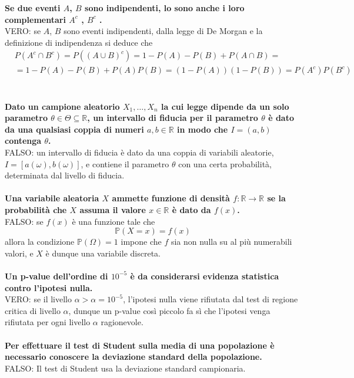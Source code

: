 \noindent \textbf{Se due eventi $A$, $B$ sono indipendenti, lo sono anche i loro complementari $A^c$ , $B^c$ .}\\
VERO: se $A$, $B$ sono eventi indipendenti, dalla legge di De Morgan e la definizione di indipendenza si deduce che
\begin{align*}
	&P(A^c \cap B^c) = P((A \cup B)^c) = 1-P(A)-P(B)+P(A \cap B) =\\
	& = 1 - P(A) - P(B) + P(A)P(B) = (1-P(A))(1-P(B)) = P(A^c)P(B^c)
\end{align*}\\\\

\noindent\textbf{Dato un campione aleatorio $X_1, \ldots, X_n$ la cui legge dipende da un solo parametro $\theta \in \Theta \subseteq \mathbb{R}$, un intervallo di fiducia per il parametro $\theta$ è dato da una qualsiasi coppia di numeri $a, b \in \mathbb{R}$ in modo che $I = (a, b)$ contenga $\theta$.}\\
FALSO: un intervallo di fiducia è dato da una coppia di variabili aleatorie, $I = [a(\omega), b(\omega)]$, e contiene il parametro $\theta$ con una certa probabilità, determinata dal livello di fiducia.\\\\

\noindent \textbf{Una variabile aleatoria $X$ ammette funzione di densità $f : \mathbb{R} \to \mathbb{R}$ se la probabilità che $X$ assuma il valore $x \in \mathbb{R}$ è dato da $f (x)$.}\\
FALSO: se $f (x)$ è una funzione tale che
\begin{equation*}
	\mathbb{P}(X=x) = f(x)
\end{equation*}
allora la condizione $\mathbb{P}(\Omega) = 1$ impone che $f$ sia non nulla su al più numerabili valori, e $X$ è dunque una variabile discreta.\\\\

\noindent \textbf{Un p-value dell'ordine di $10^{-5}$ è da considerarsi evidenza statistica contro l'ipotesi nulla.}\\
VERO: se il livello $\alpha > \alpha = 10^{-5}$, l'ipotesi nulla viene rifiutata dal test di regione critica di livello $\alpha$, dunque un p-value così piccolo fa sì che l’ipotesi venga rifiutata per ogni livello $\alpha$ ragionevole.\\\\

\noindent\textbf{Per effettuare il test di Student sulla media di una popolazione è necessario conoscere la deviazione standard della popolazione.}\\
FALSO: Il test di Student usa la deviazione standard campionaria.\\\\

